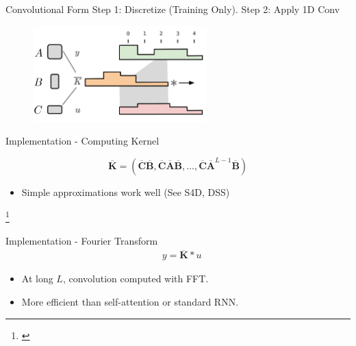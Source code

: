 \documentclass[14pt,aspectratio=169]{beamer}
\newcommand\blfootnote[1]{%
\begingroup
\renewcommand\thefootnote{}\footnote{#1}%
\addtocounter{footnote}{-1}%
\endgroup
}
\begin{document}
\begin{frame}{Convolutional Form}
Step 1: Discretize (Training Only). Step 2: Apply 1D Conv
\begin{figure}
    \centering
    \includegraphics[width=0.6\textwidth]{Figs/SSMSide.pdf}
    \label{fig:my_label}
\end{figure}
\end{frame}

\begin{frame}{Implementation - Computing Kernel}
    
    $$\boldsymbol{\overline{K}} = (\boldsymbol{\overline{C}}\boldsymbol{\overline{B}}, \boldsymbol{\overline{C}}\boldsymbol{\overline{A}}\boldsymbol{\overline{B}}, \dots, \boldsymbol{\overline{C}}\boldsymbol{\overline{A}}^{L-1}\boldsymbol{\overline{B}}) $$
    
\begin{itemize}    
    \item Simple approximations work well (See S4D, DSS)   
\end{itemize}
\blfootnote{\cite{gu2021efficiently,gupta2022diagonal,gu2022parameterization}}
\end{frame}


\begin{frame}{Implementation - Fourier Transform}
\begin{align*}
&y = \boldsymbol{\overline{K}} \ast u
\end{align*}
\begin{itemize}
    \item At long $L$, convolution computed with FFT.
    \item More efficient than self-attention or standard RNN. 
\end{itemize}
\end{frame}
\end{document}

